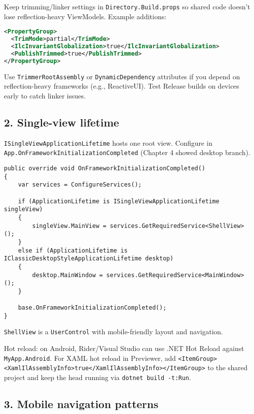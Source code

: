 Keep trimming/linker settings in
\passthrough{\lstinline!Directory.Build.props!} so shared code doesn't
lose reflection-heavy ViewModels. Example additions:

\begin{lstlisting}[language=XML]
<PropertyGroup>
  <TrimMode>partial</TrimMode>
  <IlcInvariantGlobalization>true</IlcInvariantGlobalization>
  <PublishTrimmed>true</PublishTrimmed>
</PropertyGroup>
\end{lstlisting}

Use \passthrough{\lstinline!TrimmerRootAssembly!} or
\passthrough{\lstinline!DynamicDependency!} attributes if you depend on
reflection-heavy frameworks (e.g., ReactiveUI). Test Release builds on
devices early to catch linker issues.

\subsection{2. Single-view lifetime}\label{single-view-lifetime}

\passthrough{\lstinline!ISingleViewApplicationLifetime!} hosts one root
view. Configure in
\passthrough{\lstinline!App.OnFrameworkInitializationCompleted!}
(Chapter 4 showed desktop branch).

\begin{lstlisting}
public override void OnFrameworkInitializationCompleted()
{
    var services = ConfigureServices();

    if (ApplicationLifetime is ISingleViewApplicationLifetime singleView)
    {
        singleView.MainView = services.GetRequiredService<ShellView>();
    }
    else if (ApplicationLifetime is IClassicDesktopStyleApplicationLifetime desktop)
    {
        desktop.MainWindow = services.GetRequiredService<MainWindow>();
    }

    base.OnFrameworkInitializationCompleted();
}
\end{lstlisting}

\passthrough{\lstinline!ShellView!} is a
\passthrough{\lstinline!UserControl!} with mobile-friendly layout and
navigation.

Hot reload: on Android, Rider/Visual Studio can use .NET Hot Reload
against \passthrough{\lstinline!MyApp.Android!}. For XAML hot reload in
Previewer, add
\passthrough{\lstinline!<ItemGroup><XamlIlAssemblyInfo>true</XamlIlAssemblyInfo></ItemGroup>!}
to the shared project and keep the head running via
\passthrough{\lstinline!dotnet build -t:Run!}.

\subsection{3. Mobile navigation
patterns}\label{mobile-navigation-patterns}

